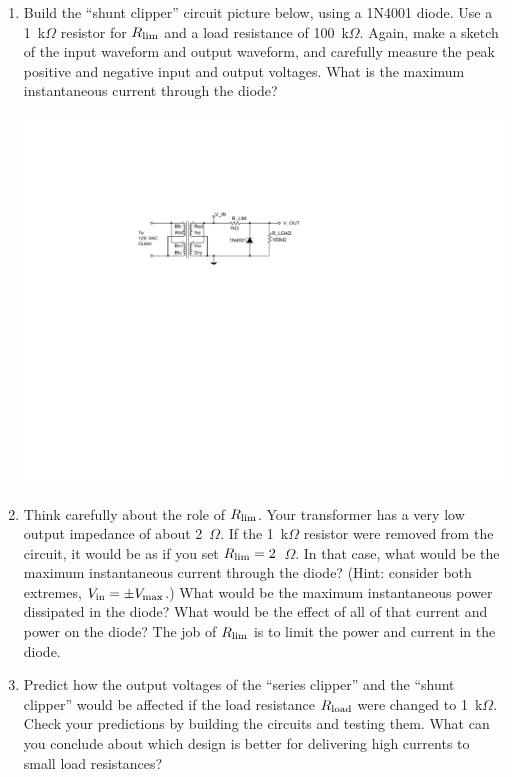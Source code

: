 \begin{enumerate}[wide]
\item Build the ``shunt clipper'' circuit picture below, using a 1N4001 diode.  Use a 1~k$\Omega$ resistor for $R_{\rm lim}$ and a load resistance of 100~k$\Omega$.  Again, make a sketch of the input waveform and output waveform, and carefully measure the peak positive and negative input and output voltages.  What is the maximum instantaneous current through the diode?  \label{part_shunt_clipper}
\begin{center}
\includegraphics{diodes/shunt_clipper.pdf}
\end{center} 
\item Think carefully about the role of $R_{\rm lim}$.  Your transformer has a very low output impedance of about 2~$\Omega$.  If the 1~k$\Omega$ resistor were removed from the circuit, it would be as if you set $R_{\rm lim} = 2$~$\Omega$.  In that case, what would be the maximum instantaneous current through the diode?  (Hint: consider both extremes, $V_{\rm in} = \pm V_{\rm max}$.) What would be the maximum instantaneous power dissipated in the diode?  What would be the effect of all of that current and power on the diode?  The job of $R_{\rm lim}$ is to limit the power and current in the diode.

\item Predict how the output voltages of the ``series clipper'' and the ``shunt clipper'' would be affected if the load resistance $R_{\rm load}$  were changed to 1~k$\Omega$.  Check your predictions by building the circuits and testing them. What can you conclude about which design is better for delivering high currents to small load resistances?  


\end{enumerate}

